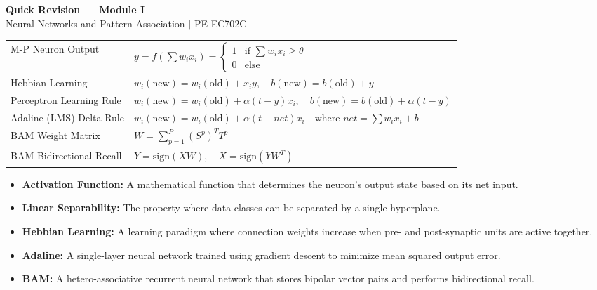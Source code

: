 \documentclass[12pt,a4paper]{article}
\renewcommand{\arraystretch}{1.45}
\begin{document}
\newpage

\begin{center}
  {\large\bfseries\color{myred} Quick Revision --- Module I}\\[3pt]
  {\small\color{mydark} Neural Networks and Pattern Association $|$ PE-EC702C}
\end{center}
\noindent{\color{myred}\rule{\linewidth}{1.2pt}}
\vspace{4pt}

\begin{tcolorbox}[formulabox, title={\textbf{Key Formulas at a Glance}}]
\renewcommand{\arraystretch}{1.3}
\begin{tabularx}{\linewidth}{B{5.0cm} X}M-P Neuron Output & $y = f\left(\sum w_i x_i\right) = \begin{cases} 1 & \text{if } \sum w_i x_i \ge \theta \\ 0 & \text{else} \end{cases}$ \\
Hebbian Learning & $w_i(\text{new}) = w_i(\text{old}) + x_i y, \quad b(\text{new}) = b(\text{old}) + y$ \\
Perceptron Learning Rule & $w_i(\text{new}) = w_i(\text{old}) + \alpha (t - y) x_i, \quad b(\text{new}) = b(\text{old}) + \alpha(t-y)$ \\
Adaline (LMS) Delta Rule & $w_i(\text{new}) = w_i(\text{old}) + \alpha (t - net) x_i \quad \text{where } net = \sum w_i x_i + b$ \\
BAM Weight Matrix & $W = \sum_{p=1}^P (S^p)^T T^p$ \\
BAM Bidirectional Recall & $Y = \text{sign}(X W), \quad X = \text{sign}(Y W^T)$
\end{tabularx}
\end{tcolorbox}

\begin{tcolorbox}[defbox, title={\textbf{One-Line Definitions}}]
\begin{itemize}[leftmargin=*, itemsep=2.5pt, topsep=0pt]
  \item \textbf{Activation Function:} A mathematical function that determines the neuron's output state based on its net input.
  \item \textbf{Linear Separability:} The property where data classes can be separated by a single hyperplane.
  \item \textbf{Hebbian Learning:} A learning paradigm where connection weights increase when pre- and post-synaptic units are active together.
  \item \textbf{Adaline:} A single-layer neural network trained using gradient descent to minimize mean squared output error.
  \item \textbf{BAM:} A hetero-associative recurrent neural network that stores bipolar vector pairs and performs bidirectional recall.
\end{itemize}
\end{tcolorbox}
\end{document}
